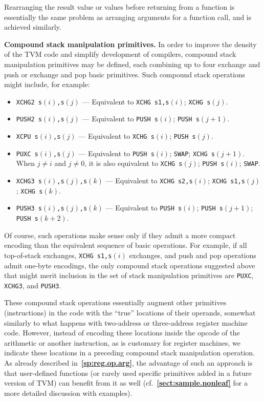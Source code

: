 \documentclass[12pt,oneside]{article}
\def\makepoint#1{\medbreak\noindent{\bf #1.\ }}
\def\nxsubpoint{\refstepcounter{subsubsection}%
    \smallbreak\makepoint{\thesubsubsection}}
\def\refpoint#1{{\rm\textbf{\ref{#1}}}}
\let\ptref=\refpoint
\def\emb#1{\textbf{#1.}}
\begin{document}
    Rearranging the result value or values before returning from a function is essentially the same problem as arranging arguments for a function call, and is achieved similarly.

    \nxsubpoint\label{sp:stack.comp}\emb{Compound stack manipulation primitives}
    In order to improve the density of the TVM code and simplify development of compilers, compound stack manipulation primitives may be defined, each combining up to four exchange and push or exchange and pop basic primitives. Such compound stack operations might include, for example:
    \begin{itemize}
        \item \texttt{XCHG2 s$(i)$,s$(j)$} --- Equivalent to \texttt{XCHG s1,s$(i)$}; \texttt{XCHG s$(j)$}.
        \item \texttt{PUSH2 s$(i)$,s$(j)$} --- Equivalent to \texttt{PUSH s$(i)$}; \texttt{PUSH s$(j+1)$}.
        \item \texttt{XCPU s$(i)$,s$(j)$} --- Equivalent to \texttt{XCHG s$(i)$}; \texttt{PUSH s$(j)$}.
        \item \texttt{PUXC s$(i)$,s$(j)$} --- Equivalent to \texttt{PUSH s$(i)$}; \texttt{SWAP}; \texttt{XCHG s$(j+1)$}. When $j\neq i$ and $j\neq0$, it is also equivalent to \texttt{XCHG s$(j)$}; \texttt{PUSH s$(i)$}; \texttt{SWAP}.
        \item \texttt{XCHG3 s$(i)$,s$(j)$,s$(k)$} --- Equivalent to \texttt{XCHG s2,s$(i)$}; \texttt{XCHG s1,s$(j)$}; \texttt{XCHG s$(k)$}.
        \item \texttt{PUSH3 s$(i)$,s$(j)$,s$(k)$} --- Equivalent to \texttt{PUSH s$(i)$}; \texttt{PUSH s$(j+1)$}; \texttt{PUSH s$(k+2)$}.
    \end{itemize}
    Of course, such operations make sense only if they admit a more compact encoding than the equivalent sequence of basic operations. For example, if all top-of-stack exchanges, \texttt{XCHG s1,s$(i)$} exchanges, and push and pop operations admit one-byte encodings, the only compound stack operations suggested above that might merit inclusion in the set of stack manipulation primitives are \texttt{PUXC}, \texttt{XCHG3}, and \texttt{PUSH3}.

    These compound stack operations essentially augment other primitives (instructions) in the code with the ``true'' locations of their operands, somewhat similarly to what happens with two-address or three-address register machine code. However, instead of encoding these locations inside the opcode of the arithmetic or another instruction, as is customary for register machines, we indicate these locations in a preceding compound stack manipulation operation. As already described in~\ptref{sp:reg.op.arg}, the advantage of such an approach is that user-defined functions (or rarely used specific primitives added in a future version of TVM) can benefit from it as well (cf.~\ptref{sect:sample.nonleaf} for a more detailed discussion with examples).
\end{document}
